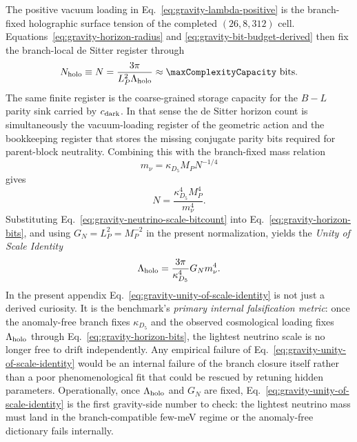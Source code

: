 \documentclass[11pt]{article}
\begin{document}
The positive vacuum loading in Eq.~\eqref{eq:gravity-lambda-positive} is the
branch-fixed holographic surface tension of the completed $(26,8,312)$ cell.
Equations~\eqref{eq:gravity-horizon-radius} and
\eqref{eq:gravity-bit-budget-derived} then fix the branch-local de Sitter
register through
\begin{equation}
\label{eq:gravity-horizon-bits}
 N_{\rm holo}\equiv N
 =
 \frac{3\pi}{L_P^2\Lambda_{\rm holo}}
 \approx \maxComplexityCapacity\ \text{bits}.
\end{equation}
The same finite register is the coarse-grained storage capacity for the
$B-L$ parity sink carried by $c_{\rm dark}$. In that sense the de Sitter
horizon count is simultaneously the vacuum-loading register of the geometric
action and the bookkeeping register that stores the missing conjugate parity
bits required for parent-block neutrality.
Combining this with the branch-fixed mass relation
\begin{equation}
\label{eq:gravity-neutrino-scale-bridge}
 m_{\nu}=\kappa_{D_5}M_PN^{-1/4}
\end{equation}
gives
\begin{equation}
\label{eq:gravity-neutrino-scale-bitcount}
 N
 =
 \frac{\kappa_{D_5}^4M_P^4}{m_{\nu}^4}.
\end{equation}
Substituting Eq.~\eqref{eq:gravity-neutrino-scale-bitcount} into
Eq.~\eqref{eq:gravity-horizon-bits}, and using $G_N=L_P^2=M_P^{-2}$ in the
present normalization, yields the \emph{Unity of Scale Identity}
\begin{equation}
\label{eq:gravity-unity-of-scale-identity}
 \Lambda_{\rm holo}
 =
 \frac{3\pi}{\kappa_{D_5}^4}
 G_N m_{\nu}^4.
\end{equation}
In the present appendix Eq.~\eqref{eq:gravity-unity-of-scale-identity} is not
just a derived curiosity. It is the benchmark's \emph{primary internal
falsification metric}: once the anomaly-free branch fixes $\kappa_{D_5}$ and
the observed cosmological loading fixes $\Lambda_{\rm holo}$ through
Eq.~\eqref{eq:gravity-horizon-bits}, the lightest neutrino scale is no longer
free to drift independently. Any empirical failure of
Eq.~\eqref{eq:gravity-unity-of-scale-identity} would be an internal failure of
the branch closure itself rather than a poor phenomenological fit that could be
rescued by retuning hidden parameters. Operationally, once
$\Lambda_{\rm holo}$ and $G_N$ are fixed, Eq.~\eqref{eq:gravity-unity-of-scale-identity}
is the first gravity-side number to check: the lightest neutrino mass must
land in the branch-compatible few-meV regime or the anomaly-free dictionary
fails internally.
\end{document}
